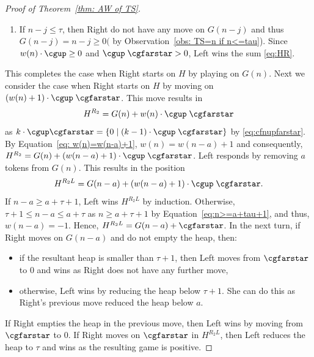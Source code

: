 \documentclass[oneside,reqno]{amsart}
\begin{document}
\begin{proof}[Proof of Theorem~\ref{thm: AW of TS}]
\begin{enumerate}
        \item If $n-j\le \tau$, then Right do not have any move on $G(n-j)$ and thus $G(n-j)=n-j\ge 0($ by Observation~\ref{obs: TS=n if n<=tau}). Since $w(n)\cdot\cgup\ge 0$ and $\cgup\;\cgfarstar>0$, Left wins the sum \eqref{eq:HR}.
    \end{enumerate}
    This completes the case when Right starts on $H$ by playing on $G(n)$. Next we consider the case when Right starts on $H$ by moving on $(w(n)+1)\cdot\cgup\;\cgfarstar$. This move results in $$H^{R_2}=G(n)+w(n)\cdot\cgup\;\cgfarstar$$ as $k\cdot\cgup\cgfarstar=\{0\mid (k-1)\cdot\cgup\;\cgfarstar\}$ by \eqref{eq:cfnupfarstar}. By Equation~\eqref{eq: w(n)=w(n-a)+1}, $w(n)=w(n-a)+1$ and consequently, $H^{R_2}=G(n)+(w(n-a)+1)\cdot\cgup\;\cgfarstar$.
    Left responds by removing $a$ tokens from $G(n)$. This results in the position $$H^{R_2L}= G(n-a)+(w(n-a)+1)\cdot\cgup\;\cgfarstar.$$ If $n-a\ge a+\tau+1$, Left wins $H^{R_2L}$ by induction. Otherwise, $\tau+1\le n-a\le a+\tau$ as $n\ge a+\tau+1$ by Equation~\eqref{eq:n>=a+tau+1}, and thus, $w(n-a)=-1$. Hence, $H^{R_2L}=G(n-a)+\cgfarstar$. In the next turn, if Right moves on $G(n-a)$ and do not empty the heap, then:
    \begin{itemize}
        \item[(a)] if the resultant heap is smaller than $\tau+1$, then Left moves from $\cgfarstar$ to 0 and wins as Right does not have any further move,
        \item[(b)] otherwise, Left wins by reducing the heap below $\tau+1$. She can do this as Right's previous move reduced the heap below $a$. 
    \end{itemize}
    If Right empties the heap in the previous move, then Left wins by moving from $\cgfarstar$ to 0. If Right moves on $\cgfarstar$ in $H^{R_2L}$, then Left reduces the heap to $\tau$ and wins as the resulting game is positive. 
    

\end{proof}
\end{document}
